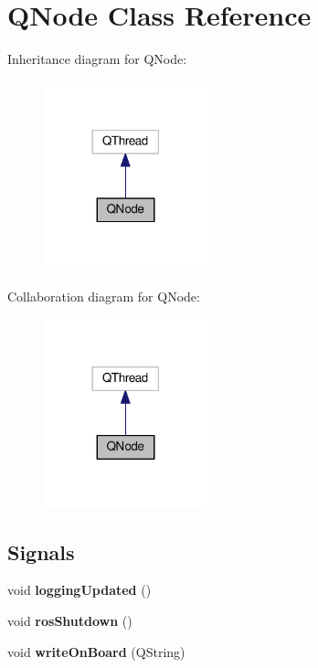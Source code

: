 \hypertarget{class_q_node}{}\section{Q\+Node Class Reference}
\label{class_q_node}


Inheritance diagram for Q\+Node\+:\nopagebreak
\begin{figure}[H]
\begin{center}
\leavevmode
\includegraphics[width=134pt]{class_q_node__inherit__graph}
\end{center}
\end{figure}


Collaboration diagram for Q\+Node\+:
\nopagebreak
\begin{figure}[H]
\begin{center}
\leavevmode
\includegraphics[width=134pt]{class_q_node__coll__graph}
\end{center}
\end{figure}
\subsection*{Signals}
\begin{DoxyCompactItemize}
\item 
void {\bfseries logging\+Updated} ()\hypertarget{class_q_node_abddcd4e0187f6d4513bbee7ba4656827}{}\label{class_q_node_abddcd4e0187f6d4513bbee7ba4656827}

\item 
void {\bfseries ros\+Shutdown} ()\hypertarget{class_q_node_a7888b171c93c5f47334f5d2815adf445}{}\label{class_q_node_a7888b171c93c5f47334f5d2815adf445}

\item 
void {\bfseries write\+On\+Board} (Q\+String)\hypertarget{class_q_node_a80d139522a1333db2c6ea33914c32378}{}\label{class_q_node_a80d139522a1333db2c6ea33914c32378}

\end{DoxyCompactItemize}
